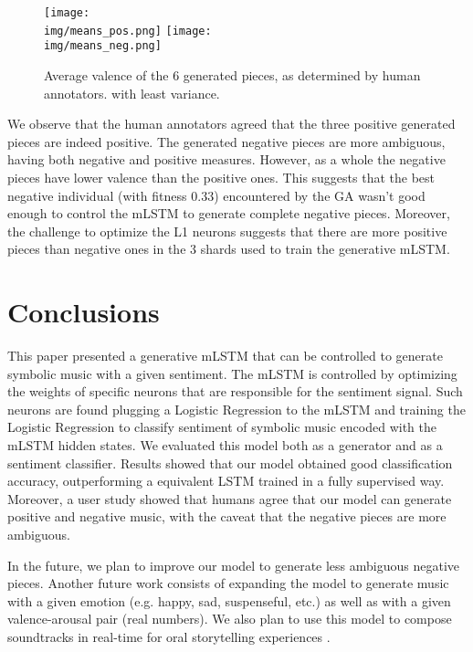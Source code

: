 \begin{figure}[!h]
 \texttt{[image: \\img/means\_pos.png]}
 \texttt{[image: \\img/means\_neg.png]}
 \caption{Average valence of the 6 generated pieces, as determined by human annotators.
 with least variance.}
 \label{fig:generated_eval}
\end{figure}

We observe that the human annotators agreed that the three positive generated pieces are indeed positive.
The generated negative pieces are more ambiguous, having both negative and positive measures.  However, as a whole the negative pieces have lower valence
than the positive ones. This suggests that
the best negative individual (with fitness $0.33$) encountered by the GA
wasn't good enough to control the mLSTM to generate complete negative pieces. Moreover, the challenge to optimize the L1 neurons suggests that there are more positive pieces than negative ones in the 3 shards used to train the generative mLSTM.

\section{Conclusions}

This paper presented a generative mLSTM that can be controlled to generate symbolic music with a given sentiment. The mLSTM is controlled by optimizing the weights
of specific neurons that are responsible for the sentiment signal. Such neurons are
found plugging a Logistic Regression to the mLSTM and training the Logistic Regression
to classify sentiment of symbolic music encoded with the mLSTM hidden states. We evaluated
this model both as a generator and as a sentiment classifier. Results showed that
our model obtained good classification accuracy, outperforming a equivalent LSTM
trained in a fully supervised way. Moreover, a user study showed that humans agree
that our model can generate positive and negative music, with the caveat that the
negative pieces are more ambiguous.

In the future, we plan to improve our model to generate less ambiguous negative pieces. Another
future work consists of expanding the model to generate music with a given
emotion (e.g. happy, sad, suspenseful, etc.) as well as with a given valence-arousal pair
(real numbers). We also plan to use this model to compose soundtracks in real-time for
oral storytelling experiences  \cite{padovani2017bardo}.


